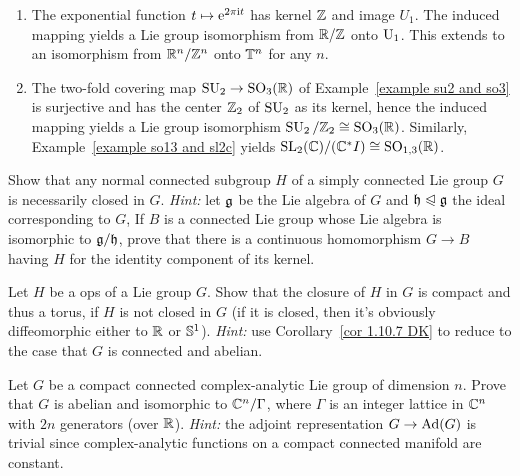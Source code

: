 \begin{example}
    \begin{enumerate}
        \item The exponential function $t\mapsto \mathrm{e}^{2\pi\mathrm{i} t}$ has kernel $\mathbb{Z}$ and image $U_1$. The induced mapping yields a Lie group isomorphism from $\mathbb{R}\slash \mathbb{Z}$ onto $\operatorname{U}_1$. This extends to an isomorphism from $\mathbb{R}^n\slash\mathbb{Z}^n$ onto $\mathbb{T}^n$ for any $n$.
        \item The two-fold covering map $\operatorname{SU}_2\to \operatorname{SO}_3(\mathbb{R})$ of Example~\ref{example su2 and so3} is surjective and has the center $\mathbb{Z}_2$ of $\operatorname{SU}_2$ as its kernel, hence the induced mapping yields a Lie group isomorphism $\operatorname{SU}_2\slash\mathbb{Z}_2\cong \operatorname{SO}_3(\mathbb{R})$. Similarly, Example~\ref{example so13 and sl2c} yields $\operatorname{SL}_2(\mathbb{C})\slash (\mathbb{C}^\ast I)\cong \operatorname{SO}_{1,3}(\mathbb{R})$.
    \end{enumerate}
\end{example}



\begin{xca}
    Show that any normal connected subgroup $H$ of a simply connected Lie group $G$ is necessarily closed in $G$. \emph{Hint:} let $\mathfrak{g}$ be the Lie algebra of $G$ and $\mathfrak{h}\trianglelefteqslant\mathfrak{g}$ the ideal corresponding to $G$, If $B$ is a connected Lie group whose Lie algebra is isomorphic to $\mathfrak{g}\slash\mathfrak{h}$, prove that there is a continuous homomorphism $G\to B$ having $H$ for the identity component of its kernel.
\end{xca}

\begin{xca}
    Let $H$ be a \gls{ops} of a Lie group $G$. Show that the closure of $H$ in $G$ is compact and thus a torus, if $H$ is not closed in $G$ (if it is closed, then it's obviously diffeomorphic either to $\mathbb{R}$ or $\mathbb{S}^1$). \emph{Hint:} use Corollary~\ref{cor 1.10.7 DK} to reduce to the case that $G$ is connected and abelian.
\end{xca}

\begin{xca}
    Let $G$ be a compact connected complex-analytic Lie group of dimension $n$. Prove that $G$ is abelian and isomorphic to $\mathbb{C}^n\slash\Gamma$, where $\Gamma$ is an integer lattice in $\mathbb{C}^n$ with $2n$ generators (over $\mathbb{R}$). \emph{Hint:} the adjoint representation $G\to \mathrm{Ad}(G)$ is trivial since complex-analytic functions on a compact connected manifold are constant.
\end{xca}









